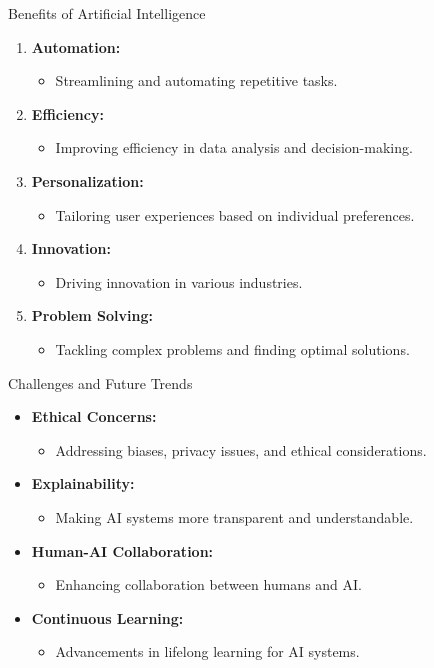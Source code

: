 \begin{frame}{Benefits of Artificial Intelligence}
  \begin{enumerate}
    \item \textbf{Automation:}
      \begin{itemize}
        \item Streamlining and automating repetitive tasks.
      \end{itemize}
    \item \textbf{Efficiency:}
      \begin{itemize}
        \item Improving efficiency in data analysis and decision-making.
      \end{itemize}
    \item \textbf{Personalization:}
      \begin{itemize}
        \item Tailoring user experiences based on individual preferences.
      \end{itemize}
    \item \textbf{Innovation:}
      \begin{itemize}
        \item Driving innovation in various industries.
      \end{itemize}
    \item \textbf{Problem Solving:}
      \begin{itemize}
        \item Tackling complex problems and finding optimal solutions.
      \end{itemize}
  \end{enumerate}
\end{frame}

\begin{frame}{Challenges and Future Trends}
  \begin{itemize}
    \item \textbf{Ethical Concerns:}
      \begin{itemize}
        \item Addressing biases, privacy issues, and ethical considerations.
      \end{itemize}
    \item \textbf{Explainability:}
      \begin{itemize}
        \item Making AI systems more transparent and understandable.
      \end{itemize}
    \item \textbf{Human-AI Collaboration:}
      \begin{itemize}
        \item Enhancing collaboration between humans and AI.
      \end{itemize}
    \item \textbf{Continuous Learning:}
      \begin{itemize}
        \item Advancements in lifelong learning for AI systems.
      \end{itemize}
  \end{itemize}
\end{frame}

